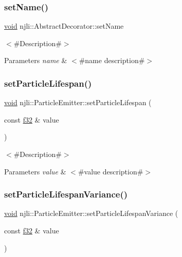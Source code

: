 \subsubsection{\texorpdfstring{set\+Name()}{setName()}}
{\footnotesize\ttfamily \mbox{\hyperlink{_thread_8h_af1e856da2e658414cb2456cb6f7ebc66}{void}} njli\+::\+Abstract\+Decorator\+::set\+Name}

$<$\#\+Description\#$>$


\begin{DoxyParams}{Parameters}
{\em name} & $<$\#name description\#$>$ \\
\hline
\end{DoxyParams}
\mbox{\label{classnjli_1_1_particle_emitter_ae66b02e5fb5fa80f2e314a6013e7059d}} 
\subsubsection{\texorpdfstring{set\+Particle\+Lifespan()}{setParticleLifespan()}}
{\footnotesize\ttfamily \mbox{\hyperlink{_thread_8h_af1e856da2e658414cb2456cb6f7ebc66}{void}} njli\+::\+Particle\+Emitter\+::set\+Particle\+Lifespan (\begin{DoxyParamCaption}\item[{const \mbox{\hyperlink{_util_8h_a5f6906312a689f27d70e9d086649d3fd}{f32}} \&}]{value }\end{DoxyParamCaption})}

$<$\#\+Description\#$>$


\begin{DoxyParams}{Parameters}
{\em value} & $<$\#value description\#$>$ \\
\hline
\end{DoxyParams}
\mbox{\label{classnjli_1_1_particle_emitter_ab925d397a4ad73aa3177dda3ccf2174f}} 
\subsubsection{\texorpdfstring{set\+Particle\+Lifespan\+Variance()}{setParticleLifespanVariance()}}
{\footnotesize\ttfamily \mbox{\hyperlink{_thread_8h_af1e856da2e658414cb2456cb6f7ebc66}{void}} njli\+::\+Particle\+Emitter\+::set\+Particle\+Lifespan\+Variance (\begin{DoxyParamCaption}\item[{const \mbox{\hyperlink{_util_8h_a5f6906312a689f27d70e9d086649d3fd}{f32}} \&}]{value }\end{DoxyParamCaption})}

